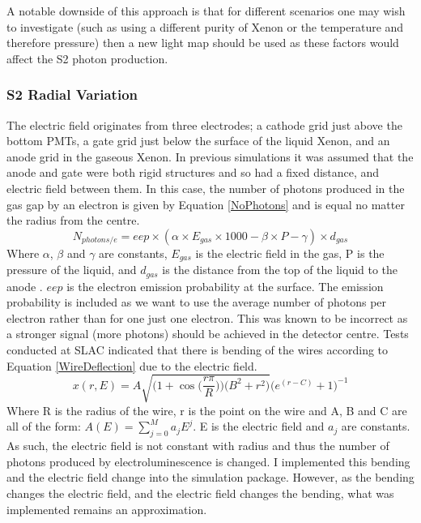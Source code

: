 \par
A notable downside of this approach is that for different scenarios one may wish to investigate (such as using a different purity of Xenon or the temperature and therefore pressure) then a new light map should be used as these factors would affect the S2 photon production.



\subsubsection{S2 Radial Variation} \label{S2RadialVariation}
\par
The electric field originates from three electrodes; a cathode grid just above the bottom PMTs, a gate grid just below the surface of the liquid Xenon, and an anode grid in the gaseous Xenon.
In previous simulations it was assumed that the anode and gate were both rigid structures and so had a fixed distance, and electric field between them.
In this case, the number of photons produced in the gas gap by an electron is given by Equation \ref{NoPhotons} and is equal no matter the radius from the centre. 
\begin{equation}
    N_{photons/e} = eep \times (\alpha \times E_{gas} \times 1000 - \beta \times P - \gamma) \times d_{gas}
    \label{NoPhotons}
\end{equation}
Where $\alpha$, $\beta$ and $\gamma$ are constants, $E_{gas}$ is the electric field in the gas, P is the pressure of the liquid, and $d_{gas}$ is the distance from the top of the liquid to the anode \cite{NoPhotonsPerElectron}.
$eep$ is the electron emission probability at the surface.
The emission probability is included as we want to use the average number of photons per electron rather than for one just one electron.
This was known to be incorrect as a stronger signal (more photons) should be achieved in the detector centre.
Tests conducted at SLAC indicated that there is bending of the wires according to Equation \ref{WireDeflection} due to the electric field.
\begin{equation}
    x(r,E) = A \sqrt{ \bigg( 1 + \cos{ \Big( \frac{r \pi}{R} } \Big) \bigg) \bigg( B^2 + r^2 \bigg) } \bigg( e^{(r-C)} + 1 \bigg)^{-1} 
    \label{WireDeflection}
\end{equation}
Where R is the radius of the wire, r is the point on the wire and A, B and C are all of the form: $A(E) = \sum_{j=0}^{M} a_{j} E^{j}$. E is the electric field and $a_{j}$ are constants.
As such, the electric field is not constant with radius and thus the number of photons produced by electroluminescence is changed.
I implemented this bending and the electric field change into the simulation package.
However, as the bending changes the electric field, and the electric field changes the bending, what was implemented remains an approximation.
